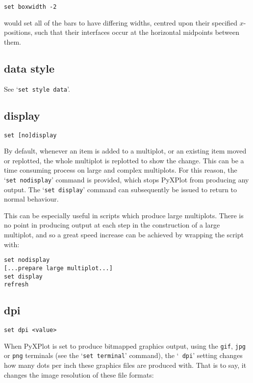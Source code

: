 \documentclass[a4paper,onecolumn,11pt]{book}
\begin{document}
\begin{verbatim}
set boxwidth -2
\end{verbatim}

\noindent would set all of the bars to have differing widths, centred upon their
specified $x$-positions, such that their interfaces occur at the horizontal
midpoints between them.


\subsection{data style}

See `{\tt set style data}'.

\subsection{display}

\begin{verbatim}
set [no]display
\end{verbatim}

By default, whenever an item is added to a multiplot, or an existing item moved
or replotted, the whole multiplot is replotted to show the change. This can be
a time consuming process on large and complex multiplots. For this reason, the
`{\tt set nodisplay}' command is provided, which stops PyXPlot from producing any
output. The `{\tt set display}' command can subsequently be issued to return to
normal behaviour.

This can be especially useful in scripts which produce large multiplots. There
is no point in producing output at each step in the construction of a large
multiplot, and so a great speed increase can be achieved by wrapping the script
with:

\begin{verbatim}
set nodisplay 
[...prepare large multiplot...] 
set display 
refresh
\end{verbatim}


\subsection{dpi}

\begin{verbatim}
set dpi <value>
\end{verbatim}

When PyXPlot is set to produce bitmapped graphics output, using the {\tt gif},
{\tt jpg} or {\tt png} terminals (see the `{\tt set terminal}' command), the `{\tt
dpi}' setting changes how many dots per inch these graphics files are produced
with. That is to say, it changes the image resolution of these file formats:
\end{document}
